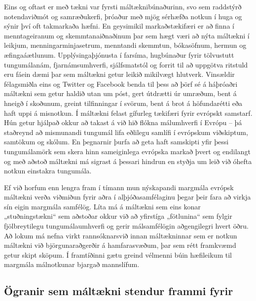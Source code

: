 \begin{multicols}{2}
Eins og oftast er með tækni var fyrsti máltæknibúnaðurinn, svo sem raddstýrð notendaviðmót og samræðukerfi, þróaður með mjög sérhæfða notkun í huga og sýnir því oft takmarkaða hæfni. En geysimikil markaðstækifæri er að finna í menntageiranum og skemmtanaiðnaðinum þar sem hægt væri að nýta máltækni í leikjum, menningarminjasetrum, menntandi skemmtun, bókasöfnum, hermun og æfingaáætlunum. Upplýsingaþjónusta í farsíma, hugbúnaður fyrir tölvustutt tungumálanám, fjarnámsumhverfi, sjálfsmatstól og forrit til að uppgötva ritstuld eru fáein dæmi þar sem máltækni getur leikið mikilvægt hlutverk. Vinsældir félagsmiðla eins og Twitter og Facebook benda til þess að þörf sé á háþróaðri máltækni sem getur haldið utan um póst, gert útdrætti úr umræðum, bent á hneigð í skoðunum, greint tilfinningar í svörum, bent á brot á höfundarétti eða haft uppi á misnotkun.
Í máltækni felast gífurleg tækifæri fyrir evrópskt samstarf. Hún getur hjálpað okkur að takast á við hið flókna málumhverfi í Evrópu -- þá staðreynd að mismunandi tungumál lifa eðlilegu samlífi í evrópskum viðskiptum, samtökum og skólum. En þegnarnir þurfa að geta haft samskipti yfir þessi tungumálamörk sem skera hinn sameiginlega evrópska markað þvert og endilangt og með aðstoð máltækni má sigrast á þessari hindrun en styðja um leið við óhefta notkun einstakra tungumála. 

Ef við horfum enn lengra fram í tímann mun nýskapandi margmála evrópsk máltækni verða viðmiðun fyrir aðra í alþjóðasamfélaginu þegar þeir fara að virkja sín eigin margmála samfélög. Líta má á máltækni sem eins konar „stuðningstækni“ sem aðstoðar okkur við að yfirstíga „fötlunina“ sem fylgir fjölbreytilegu tungu\-mála\-umhverfi og gerir málsamfélögin aðgengilegri hvert öðru. Að lokum má nefna virkt rannsóknarsvið innan máltækninnar sem er notkun máltækni við björgunaraðgerðir á hamfarasvæðum, þar sem rétt framkvæmd getur skipt sköpum. Í framtíðinni gætu greind vélmenni búin hæfileikum til margmála málnotkunar bjargað mannslífum.

\subsection{Ögranir sem máltækni stendur frammi fyrir}


\end{multicols}
